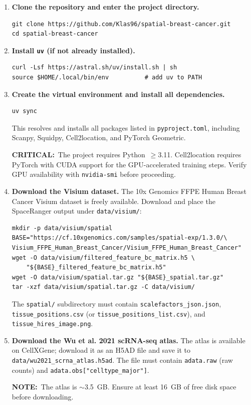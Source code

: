 \documentclass[12pt, a4paper]{article}
\newcommand{\critical}[1]{\par\smallskip\noindent%
    {\color{red!65!black}\bfseries CRITICAL:}\ #1\par\smallskip}
\newcommand{\notepar}[1]{\par\smallskip\noindent%
    {\bfseries NOTE:}\ #1\par\smallskip}
\begin{document}
\begin{enumerate}

\item \textbf{Clone the repository and enter the project directory.}
\begin{lstlisting}
git clone https://github.com/Klas96/spatial-breast-cancer.git
cd spatial-breast-cancer
\end{lstlisting}

\item \textbf{Install \texttt{uv} (if not already installed).}
\begin{lstlisting}
curl -Lsf https://astral.sh/uv/install.sh | sh
source $HOME/.local/bin/env          # add uv to PATH
\end{lstlisting}

\item \textbf{Create the virtual environment and install all dependencies.}
\begin{lstlisting}
uv sync
\end{lstlisting}
This resolves and installs all packages listed in \texttt{pyproject.toml},
including Scanpy, Squidpy, Cell2location, and PyTorch Geometric.
\critical{The project requires Python~$\geq$3.11. Cell2location requires
PyTorch with CUDA support for the GPU-accelerated training steps.
Verify GPU availability with \texttt{nvidia-smi} before proceeding.}

\item \textbf{Download the Visium dataset.}
The 10x Genomics FFPE Human Breast Cancer Visium dataset is freely
available.  Download and place the SpaceRanger output under
\texttt{data/visium/}:
\begin{lstlisting}
mkdir -p data/visium/spatial
BASE="https://cf.10xgenomics.com/samples/spatial-exp/1.3.0/\
Visium_FFPE_Human_Breast_Cancer/Visium_FFPE_Human_Breast_Cancer"
wget -O data/visium/filtered_feature_bc_matrix.h5 \
    "${BASE}_filtered_feature_bc_matrix.h5"
wget -O data/visium/spatial.tar.gz "${BASE}_spatial.tar.gz"
tar -xzf data/visium/spatial.tar.gz -C data/visium/
\end{lstlisting}
The \texttt{spatial/} subdirectory must contain
\texttt{scalefactors\_json.json}, \texttt{tissue\_positions.csv}
(or \texttt{tissue\_positions\_list.csv}), and
\texttt{tissue\_hires\_image.png}.

\item \textbf{Download the Wu et al. 2021 scRNA-seq atlas.}
The atlas is available on CellXGene; download it as an H5AD file
and save it to \texttt{data/wu2021\_scrna\_atlas.h5ad}.
The file must contain \texttt{adata.raw} (raw counts) and
\texttt{adata.obs["celltype\_major"]}.
\notepar{The atlas is $\sim$3.5~GB.  Ensure at least 16~GB of free
disk space before downloading.}


\end{enumerate}
\end{document}
